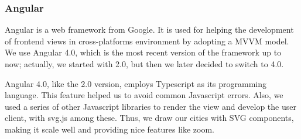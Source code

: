 \subsubsection{Angular}

Angular is a web framework from Google. It is used for helping the development
of frontend views in cross-platforms environment by adopting a MVVM model.
We use Angular 4.0, which is the most recent version of the framework up to
now; actually, we started with 2.0, but then we later decided to switch to
4.0.

Angular 4.0, like the 2.0 version, employs Typescript as its programming
language. This feature helped us to avoid common Javascript errors.
Also, we used a series of other Javascript libraries to render the view and
develop the user client, with svg.js among these. Thus, we draw our cities
with SVG components, making it scale well and providing nice features like
zoom.

